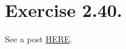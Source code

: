 \section{Exercise 2.40.}

See a post \href{https://math.stackexchange.com/questions/4709737/show-that-kx-1-x-2-x-3-x-4-langle-x-1x-4-x-2x-3-rangle-is-an-integral?rq=1}{HERE}.